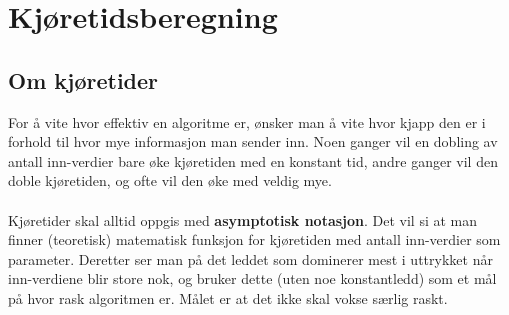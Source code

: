 \section{Kjøretidsberegning}
\subsection{Om kjøretider}
For å vite hvor effektiv en algoritme er, ønsker man å vite hvor kjapp den er i forhold til hvor mye informasjon man sender inn. Noen ganger vil en dobling av antall inn-verdier bare øke kjøretiden med en konstant tid, andre ganger vil den doble kjøretiden, og ofte vil den øke med veldig mye.
\\\\
Kjøretider skal alltid oppgis med \textbf{asymptotisk notasjon}. Det vil si at man finner (teoretisk) matematisk funksjon for kjøretiden med antall inn-verdier som parameter. Deretter ser man på det leddet som dominerer mest i uttrykket når inn-verdiene blir store nok, og bruker dette (uten noe konstantledd) som et mål på hvor rask algoritmen er. Målet er at det ikke skal vokse særlig raskt.

